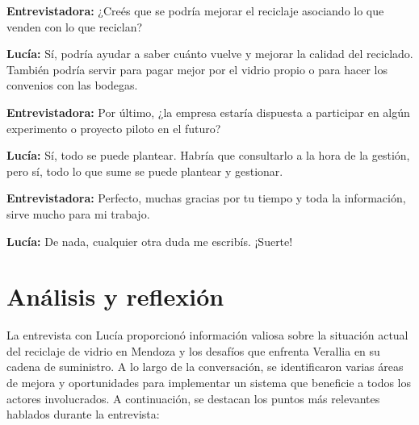 \textbf{Entrevistadora:} ¿Creés que se podría mejorar el reciclaje asociando lo que venden con lo que reciclan?

\textbf{Lucía:} Sí, podría ayudar a saber cuánto vuelve y mejorar la calidad del reciclado. También podría servir para pagar mejor por el vidrio propio o para hacer los convenios con las bodegas.

\textbf{Entrevistadora:} Por último, ¿la empresa estaría dispuesta a participar en algún experimento o proyecto piloto en el futuro?

\textbf{Lucía:} Sí, todo se puede plantear. Habría que consultarlo a la hora de la gestión, pero sí, todo lo que sume se puede plantear y gestionar.

\textbf{Entrevistadora:} Perfecto, muchas gracias por tu tiempo y toda la información, sirve mucho para mi trabajo.

\textbf{Lucía:} De nada, cualquier otra duda me escribís. ¡Suerte!

\section{Análisis y reflexión}

La entrevista con Lucía proporcionó información valiosa sobre la situación actual del reciclaje de vidrio en Mendoza y los desafíos que enfrenta Verallia en su cadena de suministro. A lo largo de la conversación, se identificaron varias áreas de mejora y oportunidades para implementar un sistema que beneficie a todos los actores involucrados. A continuación, se destacan los puntos más relevantes hablados durante la entrevista:

